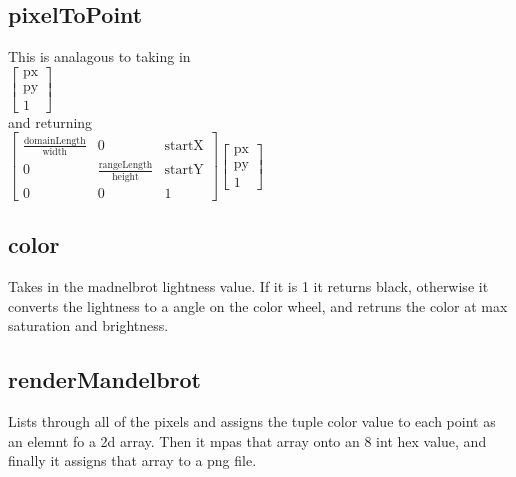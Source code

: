\documentclass{article}
\begin{document}
\pagebreak
\begin{minipage}[t]{0.45\textwidth}
    \subsection{pixelToPoint}
    This is analagous to taking in\\ $\begin{bmatrix} \text{px}\\\text{py}\\1 \end{bmatrix}$\\ and returning\\ $\begin{bmatrix} \frac{\text{domainLength}}{\text{width}}& 0&\text{startX}\\ 0& \frac{\text{rangeLength}}{\text{height}}&\text{startY}\\0&0&1\end{bmatrix} \begin{bmatrix} \text{px}\\\text{py}\\1 \end{bmatrix}$
    \subsection{color}
    Takes in the madnelbrot lightness value. If it is 1 it returns black, otherwise it converts the lightness to a angle on the color wheel, and retruns the color at max saturation and brightness. 
    \subsection{renderMandelbrot}
    Lists through all of the pixels and assigns the tuple color value to each point as an elemnt fo a 2d array. Then it mpas that array onto an 8 int hex value, and finally it assigns that array to a png file. 
\end{minipage}
\hspace{20pt}
\end{document}
